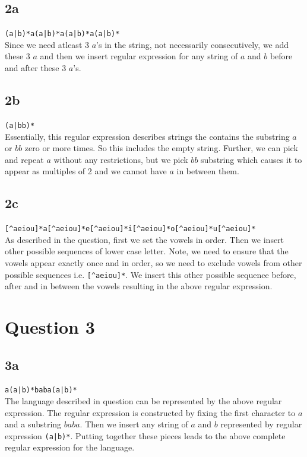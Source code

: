 \documentclass{article}
\begin{document}
    \subsection*{2a}
    \verb!(a|b)*a(a|b)*a(a|b)*a(a|b)*! \\

    Since we need atleast 3 $a$'s in the string, not necessarily consecutively, we add these 3 $a$ and then we insert regular expression for any string of $a$ and $b$ before and after these 3 $a$'s.

    \subsection*{2b}
    \verb!(a|bb)*! \\

    Essentially, this regular expression describes strings the contains the substring $a$ or $bb$ zero or more times. So this includes the empty string. Further, we can pick and repeat $a$ without any restrictions, but we pick $bb$ substring which causes it to appear as multiples of 2 and we cannot have $a$ in between them.

    \subsection*{2c}
    \verb![^aeiou]*a[^aeiou]*e[^aeiou]*i[^aeiou]*o[^aeiou]*u[^aeiou]*! \\
    
    As described in the question, first we set the vowels in order. Then we insert other possible sequences of lower case letter. Note, we need to ensure that the vowels appear exactly once and in order, so we need to exclude vowels from other possible sequences i.e. \verb![^aeiou]*!. We insert this other possible sequence before, after and in between the vowels resulting in the above regular expression.

    \section*{Question 3}

    \subsection*{3a}
    \verb!a(a|b)*baba(a|b)*! \\

    The language described in question can be represented by the above regular expression. The regular expression is constructed by fixing the first character to $a$ and a substring $baba$. Then we insert any string of $a$ and $b$ represented by regular expression \verb!(a|b)*!. Putting together these pieces leads to the above complete regular expression for the language.
\end{document}
